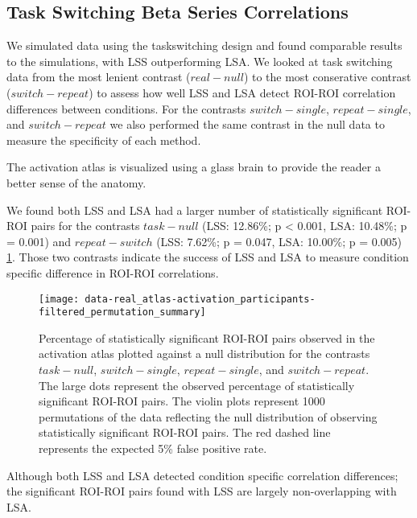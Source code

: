 \documentclass[10pt,letterpaper]{article}
\begin{document}
\subsection*{Task Switching Beta Series Correlations}
\label{results:bsc-taskswitch}

We simulated data using the taskswitching design and found comparable
results to the simulations, with LSS outperforming LSA.
We looked at task switching data from the most lenient
contrast ($real - null$) to the most conserative contrast ($switch - repeat$)
to assess how well LSS and LSA detect ROI-ROI correlation differences between conditions.
For the contrasts $switch - single$, $repeat - single$, and $switch - repeat$ we also
performed the same contrast in the null data to measure the specificity of each method.

The activation atlas is visualized using a glass brain to provide the reader a better sense
of the anatomy.

We found both LSS and LSA had a larger number of statistically significant ROI-ROI pairs
for the contrasts $task - null$ (LSS: 12.86\%; p < 0.001, LSA: 10.48\%; p = 0.001)
and $repeat - switch$ (LSS: 7.62\%; p = 0.047, LSA: 10.00\%; p = 0.005) \ref{fig:main-result}.
Those two contrasts indicate the success of LSS and LSA to measure
condition specific difference in ROI-ROI correlations.

\begin{figure}[H]
  \texttt{[image: data-real\_atlas-activation\_participants-filtered\_permutation\_summary]}
  \caption{
    Percentage of statistically significant ROI-ROI pairs observed in the activation atlas
    plotted against a null distribution for the contrasts $task - null$, $switch - single$,
    $repeat - single$, and $switch - repeat$.
    The large dots represent the observed percentage of statistically significant ROI-ROI pairs.
    The violin plots represent 1000 permutations of the data reflecting the null distribution
    of observing statistically significant ROI-ROI pairs.
    The red dashed line represents the expected 5\% false positive rate.
  }
  \label{fig:main-result}
\end{figure}

Although both LSS and LSA detected condition specific correlation differences;
the significant ROI-ROI pairs found with LSS are largely non-overlapping with LSA.
\end{document}
